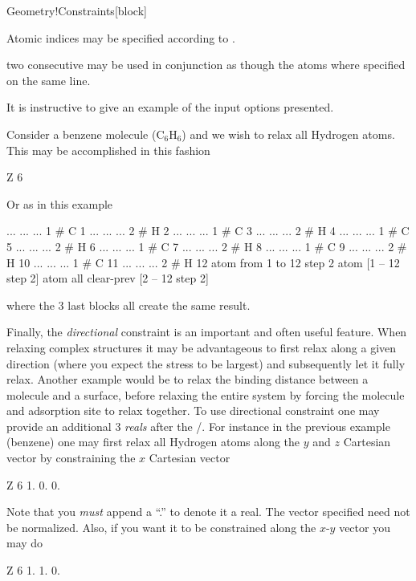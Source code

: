 \begin{fdfentry}{Geometry!Constraints}[block]
\begin{fdfoptions}
    Atomic indices may be specified according to .

    \note two consecutive  may be used in conjunction
    as though the atoms where specified on the same line.

  \end{fdfoptions}

  It is instructive to give an example of the input options presented.

  Consider a benzene molecule ($\mathrm{C}_6\mathrm{H}_6$) and we wish
  to relax all Hydrogen atoms. This may be accomplished in this fashion
  \begin{fdfexample}
      Z 6
  \end{fdfexample}
  Or as in this example
  \begin{fdfexample}
      ... ... ... 1   # C 1
      ... ... ... 2   # H 2
      ... ... ... 1   # C 3
      ... ... ... 2   # H 4
      ... ... ... 1   # C 5
      ... ... ... 2   # H 6
      ... ... ... 1   # C 7
      ... ... ... 2   # H 8
      ... ... ... 1   # C 9
      ... ... ... 2   # H 10
      ... ... ... 1   # C 11
      ... ... ... 2   # H 12
      atom from 1 to 12 step 2
      atom [1 -- 12 step 2]
      atom all
      clear-prev [2 -- 12 step 2]
  \end{fdfexample}
  where the 3 last blocks all create the same result.

  Finally, the \emph{directional} constraint is an important and often
  useful feature. 
  When relaxing complex structures it may be advantageous to first
  relax along a given direction (where you expect the stress to be
  largest) and subsequently let it fully relax. Another example would
  be to relax the binding distance between a molecule and a surface,
  before relaxing the entire system by forcing the molecule and
  adsorption site to relax together.
  To use directional constraint one may provide an additional 3
  \emph{reals} after the /.
  For instance in the previous example (benzene) one may first relax
  all Hydrogen atoms along the $y$ and $z$ Cartesian vector by
  constraining the $x$ Cartesian vector
  \begin{fdfexample}
      Z 6 1. 0. 0.
  \end{fdfexample}
  Note that you \emph{must} append a ``.'' to denote it a real. The
  vector specified need not be normalized. Also, if you want it to
  be constrained along the $x$-$y$ vector you may do
  \begin{fdfexample}
      Z 6 1. 1. 0.
  \end{fdfexample}
  
\end{fdfentry}



